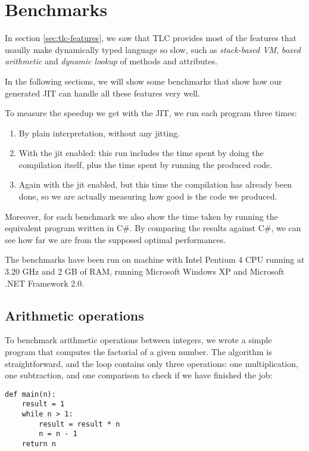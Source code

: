 \section{Benchmarks}

In section \ref{sec:tlc-features}, we saw that TLC provides most of the
features that usaully make dynamically typed language so slow, such as
\emph{stack-based VM}, \emph{boxed arithmetic} and \emph{dynamic lookup} of
methods and attributes.

In the following sections, we will show some benchmarks that show how our
generated JIT can handle all these features very well.

To measure the speedup we get with the JIT, we run each program three times:

\begin{enumerate}
\item By plain interpretation, without any jitting.
\item With the jit enabled: this run includes the time spent by doing the
  compilation itself, plus the time spent by running the produced code.
\item Again with the jit enabled, but this time the compilation has already
  been done, so we are actually measuring how good is the code we produced.
\end{enumerate}

Moreover, for each benchmark we also show the time taken by running the
equivalent program written in C\#.  By comparing the results against C\#, we
can see how far we are from the supposed optimal performances.  

The benchmarks have been run on machine with Intel Pentium 4 CPU running at
3.20 GHz and 2 GB of RAM, running Microsoft Windows XP and Microsoft .NET
Framework 2.0.

\subsection{Arithmetic operations}

To benchmark arithmetic operations between integers, we wrote a simple program
that computes the factorial of a given number.  The algorithm is
straightforward, and the loop contains only three operations: one
multiplication, one subtraction, and one comparison to check if we have
finished the job:

\begin{lstlisting}
def main(n):
    result = 1
    while n > 1:
        result = result * n
        n = n - 1
    return n
\end{lstlisting}

